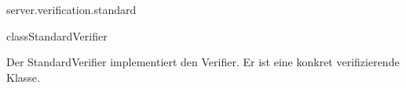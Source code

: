 \begin{texdocpackage}{server.verification.standard}
\label{texdoclet:edu.kit.informatik.studyplan.server.verification.standard}

\begin{texdocclass}{class}{StandardVerifier}
\label{texdoclet:edu.kit.informatik.studyplan.server.verification.standard.StandardVerifier}
\begin{texdocclassintro}
Der StandardVerifier implementiert den Verifier.
 Er ist eine konkret verifizierende Klasse.\end{texdocclassintro}
\begin{texdocclassconstructors}
\end{texdocclassconstructors}
\begin{texdocclassmethods}
\end{texdocclassmethods}
\end{texdocclass}


\end{texdocpackage}



